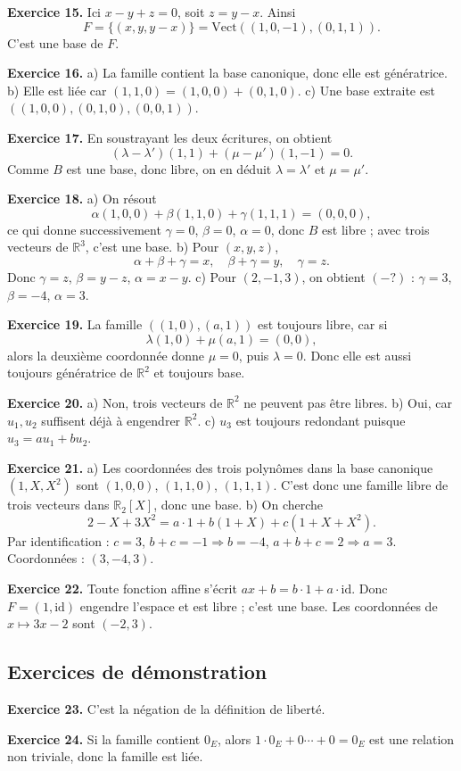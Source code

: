 \documentclass[11pt,a4paper]{article}
\newcommand{\R}{\mathbb R}
\newcommand{\Vect}{\mathrm{Vect}}
\newcommand{\id}{\mathrm{id}}
\begin{document}
\textbf{Exercice 15.} Ici $x-y+z=0$, soit $z=y-x$. Ainsi
\[F=\{(x,y,y-x)\}=\Vect((1,0,-1),(0,1,1)).\]
C'est une base de $F$.

\textbf{Exercice 16.} a) La famille contient la base canonique, donc elle est génératrice. b) Elle est liée car $(1,1,0)=(1,0,0)+(0,1,0)$. c) Une base extraite est $((1,0,0),(0,1,0),(0,0,1))$.

\textbf{Exercice 17.} En soustrayant les deux écritures, on obtient
\[(\lambda-\lambda')(1,1)+(\mu-\mu')(1,-1)=0.\]
Comme $B$ est une base, donc libre, on en déduit $\lambda=\lambda'$ et $\mu=\mu'$.

\textbf{Exercice 18.} a) On résout
\[\alpha(1,0,0)+\beta(1,1,0)+\gamma(1,1,1)=(0,0,0),\]
ce qui donne successivement $\gamma=0$, $\beta=0$, $\alpha=0$, donc $B$ est libre ; avec trois vecteurs de $\R^3$, c'est une base. b) Pour $(x,y,z)$,
\[\alpha+\beta+\gamma=x,\quad \beta+\gamma=y,\quad \gamma=z.\]
Donc $\gamma=z$, $\beta=y-z$, $\alpha=x-y$. c) Pour $(2,-1,3)$, on obtient $(-? )$ : $\gamma=3$, $\beta=-4$, $\alpha=3$.

\textbf{Exercice 19.} La famille $((1,0),(a,1))$ est toujours libre, car si
\[\lambda(1,0)+\mu(a,1)=(0,0),\]
alors la deuxième coordonnée donne $\mu=0$, puis $\lambda=0$. Donc elle est aussi toujours génératrice de $\R^2$ et toujours base.

\textbf{Exercice 20.} a) Non, trois vecteurs de $\R^2$ ne peuvent pas être libres. b) Oui, car $u_1,u_2$ suffisent déjà à engendrer $\R^2$. c) $u_3$ est toujours redondant puisque $u_3=au_1+bu_2$.

\textbf{Exercice 21.} a) Les coordonnées des trois polynômes dans la base canonique $(1,X,X^2)$ sont $(1,0,0)$, $(1,1,0)$, $(1,1,1)$. C'est donc une famille libre de trois vecteurs dans $\R_2[X]$, donc une base. b) On cherche
\[2-X+3X^2=a\cdot 1+b(1+X)+c(1+X+X^2).\]
Par identification : $c=3$, $b+c=-1\Rightarrow b=-4$, $a+b+c=2\Rightarrow a=3$. Coordonnées : $(3,-4,3)$.

\textbf{Exercice 22.} Toute fonction affine s'écrit $ax+b=b\cdot 1+a\cdot \id$. Donc $F=(1,\id)$ engendre l'espace et est libre ; c'est une base. Les coordonnées de $x\mapsto 3x-2$ sont $(-2,3)$.

\subsection*{Exercices de démonstration}
\textbf{Exercice 23.} C'est la négation de la définition de liberté.

\textbf{Exercice 24.} Si la famille contient $0_E$, alors $1\cdot 0_E+0\cdots+0=0_E$ est une relation non triviale, donc la famille est liée.
\end{document}
